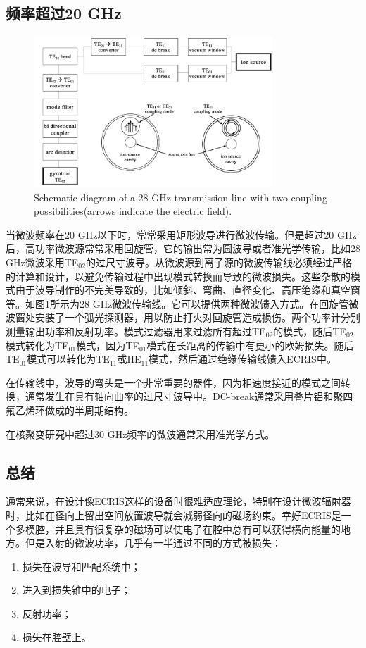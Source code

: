 \documentclass[fontset=windows]{article}
\begin{document}
\subsection{频率超过20 GHz}
\begin{figure}
    \centering
    \includegraphics[width=0.8\textwidth]{Schematic diagram.png}
    \caption{Schematic diagram of a 28 GHz transmission line with two coupling possibilities(arrows indicate the electric field).}
    \label{f-3}
\end{figure}
当微波频率在20 GHz以下时，常常采用矩形波导进行微波传输。但是超过20 GHz后，高功率微波源常常采用回旋管，它的输出常为圆波导或者准光学传输，比如28 GHz微波采用TE$_{02}$的过尺寸波导。从微波源到离子源的微波传输线必须经过严格的计算和设计，以避免传输过程中出现模式转换而导致的微波损失。这些杂散的模式由于波导制作的不完美导致的，比如倾斜、弯曲、直径变化、高压绝缘和真空窗等。如图\ref{f-3}所示为28 GHz微波传输线。它可以提供两种微波馈入方式。在回旋管微波窗处安装了一个弧光探测器，用以防止打火对回旋管造成损伤。两个功率计分别测量输出功率和反射功率。模式过滤器用来过滤所有超过TE$_{02}$的模式，随后TE$_{02}$模式转化为TE$_{01}$模式，因为TE$_{01}$模式在长距离的传输中有更小的欧姆损失。随后TE$_{01}$模式可以转化为TE$_{11}$或HE$_{11}$模式，然后通过绝缘传输线馈入ECRIS中。

在传输线中，波导的弯头是一个非常重要的器件，因为相速度接近的模式之间转换，通常发生在具有轴向曲率的过尺寸波导中。DC-break通常采用叠片铝和聚四氟乙烯环做成的半周期结构。

在核聚变研究中超过30 GHz频率的微波通常采用准光学方式。

\subsection{总结}
通常来说，在设计像ECRIS这样的设备时很难适应理论，特别在设计微波辐射器时，比如在径向上留出空间放置波导就会减弱径向的磁场约束。幸好ECRIS是一个多模腔，并且具有很复杂的磁场可以使电子在腔中总有可以获得横向能量的地方。但是入射的微波功率，几乎有一半通过不同的方式被损失：
\begin{enumerate}
    \item [1.]损失在波导和匹配系统中；
    \item [2.]进入到损失锥中的电子；
    \item [3.]反射功率；
    \item [4.]损失在腔壁上。
\end{enumerate}
\end{document}
